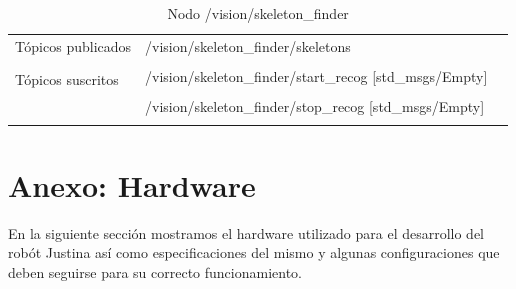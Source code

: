 \documentclass[a4paper,usenames,dvipsnames,svgnames,table]{book}
\begin{document}
\begin{table}[H]
\begin{center}
\begin{tabular}{|l|p{6cm}|p{5cm}|}%
\hline

Tópicos publicados
& /vision/skeleton\_finder/skeletons  &  \\
& & \\
\hline

\multirow{2}{*}{Tópicos suscritos}
& /vision/skeleton\_finder/start\_recog [std\_msgs/Empty] &  \\
& & \\
& /vision/skeleton\_finder/stop\_recog [std\_msgs/Empty] &  \\
& & \\
\cline{1-3}
 
\end{tabular}
\caption{Nodo /vision/skeleton\_finder}
\label{skeleton finder node}
\end{center}
\end{table}





































\appendix

\chapter{Anexo: Hardware} \label{aped.A}
En la siguiente sección mostramos el hardware utilizado para el desarrollo del robót Justina así como especificaciones
del mismo y algunas configuraciones que deben seguirse para su correcto funcionamiento.
\end{document}
